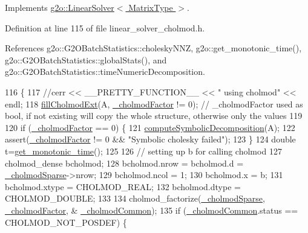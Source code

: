Implements \hyperlink{classg2o_1_1LinearSolver_aa44b40826d50203c8ce2ff258c34e030}{g2o\+::\+Linear\+Solver$<$ Matrix\+Type $>$}.



Definition at line 115 of file linear\+\_\+solver\+\_\+cholmod.\+h.



References g2o\+::\+G2\+O\+Batch\+Statistics\+::cholesky\+N\+NZ, g2o\+::get\+\_\+monotonic\+\_\+time(), g2o\+::\+G2\+O\+Batch\+Statistics\+::global\+Stats(), and g2o\+::\+G2\+O\+Batch\+Statistics\+::time\+Numeric\+Decomposition.


\begin{DoxyCode}
116     \{
117       \textcolor{comment}{//cerr << \_\_PRETTY\_FUNCTION\_\_ << " using cholmod" << endl;}
118       \hyperlink{classg2o_1_1LinearSolverCholmod_a4b1e18e870b5663f45900dea3bba9155}{fillCholmodExt}(A, \hyperlink{classg2o_1_1LinearSolverCholmod_a674a54287f98130c4aab303508ab945b}{\_cholmodFactor} != 0); \textcolor{comment}{// \_cholmodFactor used as bool,
       if not existing will copy the whole structure, otherwise only the values}
119 
120       \textcolor{keywordflow}{if} (\hyperlink{classg2o_1_1LinearSolverCholmod_a674a54287f98130c4aab303508ab945b}{\_cholmodFactor} == 0) \{
121         \hyperlink{classg2o_1_1LinearSolverCholmod_a40a0f991ae3bb914f2313b55c514640d}{computeSymbolicDecomposition}(A);
122         assert(\hyperlink{classg2o_1_1LinearSolverCholmod_a674a54287f98130c4aab303508ab945b}{\_cholmodFactor} != 0 && \textcolor{stringliteral}{"Symbolic cholesky failed"});
123       \}
124       \textcolor{keywordtype}{double} t=\hyperlink{namespaceg2o_aa64237935c7d8411b4369234a5f661ea}{get\_monotonic\_time}();
125 
126       \textcolor{comment}{// setting up b for calling cholmod}
127       cholmod\_dense bcholmod;
128       bcholmod.nrow  = bcholmod.d = \hyperlink{classg2o_1_1LinearSolverCholmod_aefbdba58c18dc9eac831eb3d7c24fa18}{\_cholmodSparse}->nrow;
129       bcholmod.ncol  = 1;
130       bcholmod.x     = b;
131       bcholmod.xtype = CHOLMOD\_REAL;
132       bcholmod.dtype = CHOLMOD\_DOUBLE;
133 
134       cholmod\_factorize(\hyperlink{classg2o_1_1LinearSolverCholmod_aefbdba58c18dc9eac831eb3d7c24fa18}{\_cholmodSparse}, \hyperlink{classg2o_1_1LinearSolverCholmod_a674a54287f98130c4aab303508ab945b}{\_cholmodFactor}, &
      \hyperlink{classg2o_1_1LinearSolverCholmod_ae7def9c6bf341e0d2f3a3936121fefa1}{\_cholmodCommon});
135       \textcolor{keywordflow}{if} (\hyperlink{classg2o_1_1LinearSolverCholmod_ae7def9c6bf341e0d2f3a3936121fefa1}{\_cholmodCommon}.status == CHOLMOD\_NOT\_POSDEF) \{

\end{DoxyCode}
